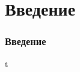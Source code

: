 \section*{Введение}

\begin{frame}
    \frametitle{Введение}
    \begin{center}
         t
    \end{center}
\end{frame}